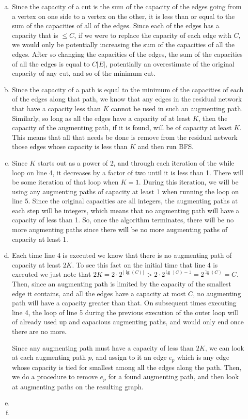 \documentclass{article}
\begin{document}
\begin{enumerate}[a.]
\item Since the capacity of a cut is the sum of the capacity of the edges going from a vertex on one side to a vertex on the other, it is less than or equal to the sum of the capacities of all of the edges. Since each of the edges has a capacity that is $\le C$, if we were to replace the capacity of each edge with $C$, we would only be potentially increasing the sum of the capacities of all the edges. After so changing the capacities of the edges, the sum of the capacities of all the edges is equal to $C|E|$, potentially an overestimate of the original capacity of any cut, and so of the minimum cut.
\item
Since the capacity of a path is equal to the minimum of the capacities of each of the edges along that path, we know that any edges in the residual network that have a capacity less than $K$ cannot be used in such an augmenting path. Similarly, so long as all the edges have a capacity of at least $K$, then the capacity of the augmenting path, if it is found, will be of capacity at least $K$. This means that all that needs be done is remove from the residual network those edges whose capacity is less than $K$ and then run BFS.
\item
Since $K$ starts out as a power of 2, and through each iteration of the while loop on line 4, it decreases by a factor of two until it is less than 1. There will be some iteration of that loop when $K=1$. During this iteration, we will be using any augmenting paths of capacity at least 1 when running the loop on line 5. Since the original capacities are all integers, the augmenting paths at each step will be integers, which means that no augmenting path will have a capacity of less than 1. So, once the algorithm terminates, there will be no more augmenting paths since there will be no more augmenting paths of capacity at least 1.
\item
Each time line 4 is executed we know that there is no augmenting path of capacity at least $2K$. To see this fact on the initial time that line 4 is executed we just note that $2 K = 2\cdot 2^{\lfloor \lg(C)\rfloor} > 2\cdot2^{\lg(C) -1} = 2^{\lg(C)} = C$. Then, since an augmenting path is limited by the capacity of the smallest edge it contains, and all the edges have a capacity at most $C$, no augmenting path will have a capacity greater than that. On subsequent times executing line 4, the loop of line 5 during the previous execution of the outer loop will of already used up and capacious augmenting paths, and would only end once there are no more. 

Since any augmenting path must have a capacity of less than $2K$, we can look at each augmenting path $p$, and assign to it an edge $e_p$ which is any edge whose capacity is tied for smallest among all the edges along the path. Then, we do a procedure to remove $e_p$ for a found augmenting path, and then look at augmenting paths on the resulting graph. %
\item

\item

\end{enumerate}
\end{document}
